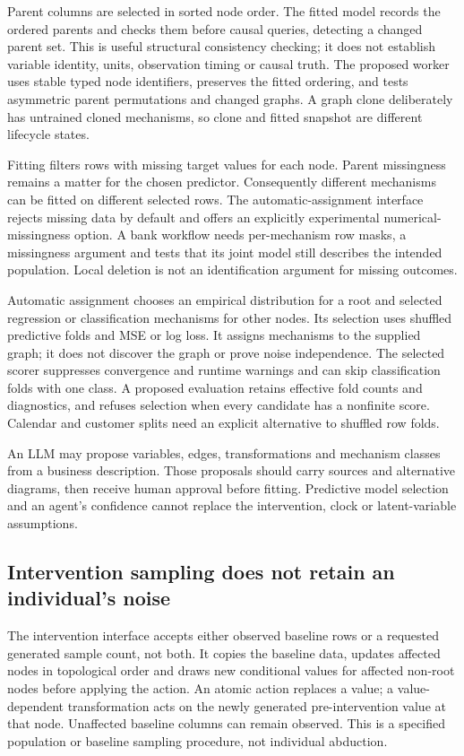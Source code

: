Parent columns are selected in sorted node order. The fitted model records
the ordered parents and checks them before causal queries, detecting a
changed parent set. This is useful structural consistency checking; it
does not establish variable identity, units, observation timing or causal
truth. The proposed worker uses stable typed node identifiers, preserves
the fitted ordering, and tests asymmetric parent permutations and changed
graphs. A graph clone deliberately has untrained cloned mechanisms, so
clone and fitted snapshot are different lifecycle states.
\citep{exec24_gcm_source,exec24_gcm_choice}

Fitting filters rows with missing target values for each node. Parent
missingness remains a matter for the chosen predictor. Consequently
different mechanisms can be fitted on different selected rows. The
automatic-assignment interface rejects missing data by default and offers
an explicitly experimental numerical-missingness option. A bank workflow
needs per-mechanism row masks, a missingness argument and tests that its
joint model still describes the intended population. Local deletion is
not an identification argument for missing outcomes.
\citep{exec24_gcm_source,exec24_gcm_choice}

Automatic assignment chooses an empirical distribution for a root and
selected regression or classification mechanisms for other nodes. Its
selection uses shuffled predictive folds and MSE or log loss. It assigns
mechanisms to the supplied graph; it does not discover the graph or prove
noise independence. The selected scorer suppresses convergence and runtime
warnings and can skip classification folds with one class. A proposed
evaluation retains effective fold counts and diagnostics, and refuses
selection when every candidate has a nonfinite score. Calendar and
customer splits need an explicit alternative to shuffled row folds.
\citep{exec24_gcm_source,exec24_gcm_choice}

An LLM may propose variables, edges, transformations and mechanism classes
from a business description. Those proposals should carry sources and
alternative diagrams, then receive human approval before fitting. Predictive
model selection and an agent's confidence cannot replace the intervention,
clock or latent-variable assumptions.\citep{exec24_gcm_choice}

\subsection{Intervention sampling does not retain an individual's noise}
The intervention interface accepts either observed baseline rows or a
requested generated sample count, not both. It copies the baseline data,
updates affected nodes in topological order and draws new conditional
values for affected non-root nodes before applying the action. An atomic
action replaces a value; a value-dependent transformation acts on the
newly generated pre-intervention value at that node. Unaffected baseline
columns can remain observed. This is a specified population or baseline
sampling procedure, not individual abduction.\citep{exec24_gcm_source}

